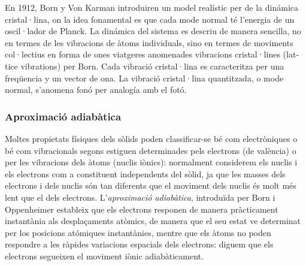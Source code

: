 \documentclass[12pt]{article} %
\begin{document}
En 1912, Born y Von Karman \cite{Born:1912:SRG} introduiren un model realístic per de la dinámica cristal·lina, on la idea fonamental es que cada mode normal té l'energia de un oscil·lador de Planck. La dinámica del sistema es descriu de manera sencilla, no en termes de les vibracions de àtoms individuals, sino en termes de moviments col·lectius en forma de ones viatgeres anomenades vibracions cristal·lines (\foreignlanguage{english}{lattice vibrations}) per Born. Cada vibració cristal·lina es caracteritza per una freqüencia y un vector de ona.
La vibració cristal·lina quantitzada, o mode normal, s'anomena fonó per analogía amb el fotó. %


\subsubsection{Aproximació adiabàtica}

Moltes propietats físiques dels sòlids poden classificar-se bé com electròniques o bé com vibracionals segons estiguen determinades pels electrons (de valència) o per les vibracions dels àtoms (nuclis iònics): normalment considerem els nuclis i els electrons com a constituent independents del sòlid, ja que les masses dels electrons i dels nuclis són tan diferents que el moviment dels nuclis és molt més lent que el dels electrons. L'\emph{aproximació adiabàtica}, introduïda per Born i Oppenheimer \cite{ANDP:ANDP19273892002} estableix que els electrons responen de manera pràcticament instantània als desplaçaments atòmics, de manera que el seu estat ve determinat per los posicions atómiques instantànies, mentre que els àtoms no poden respondre a les ràpides variacions espacials dels electrons: diguem que els electrons segueixen el moviment iònic adiabàticament.
\end{document}

